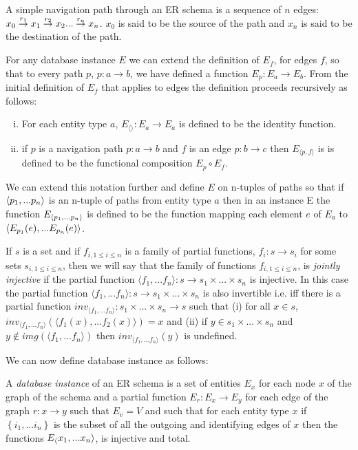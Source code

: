 \documentclass[10pt,a4paper]{article}
\newcommand{\set}[1]{\left\{#1\right\}}
\newcommand{\veee}{v}
\newcommand{\Veee}{V}
\newcommand{\term}[1]{\textit{{#1}}}
\begin{document}
\noindent A simple navigation path through an ER schema  is a
sequence of  $n$ edges:
$\overset{r_1}{x_0 \rightarrow   x_1} \overset{r_2}{\rightarrow} x_2 ... \overset{r_n}{\rightarrow} x_n$.  $x_0$ is said to be the source of the path and $x_n$ is said to be the destination of the path. 

\noindent For any database instance $E$ we can  extend  the definition of
$E_f$, for edges $f$,  so that to every path $p$, $p: a \rightarrow b$,  we have defined a function $E_p: E_a \rightarrow E_b$. From the initial definition of $E_f$ that applies to 
edges the definition proceeds recursively as follows: 
\begin{enumerate} [(i)]
\item{  For each entity type $a$, $E_{\langle \rangle}: E_a \rightarrow E_a$ is defined to be the identity function.
}
\item{   if $p$ is a navigation path $p: a \rightarrow b$ and $f$ is an edge $p: b \rightarrow c$ then $E_{\langle p,f \rangle}$ is 
is defined to be the functional composition $E_p \circ E_f$.
}
\end{enumerate}

We can extend this notation further and define $E$ on n-tuples of paths so that if 
$\langle p_1,...p_n\rangle$ is an n-tuple of paths from entity type $a$ then in an instance E
the function  $E_{\langle p_1,...p_n\rangle}$ is defined to be the function mapping each element $e$ 
of $E_a$ to 
$\langle E_{p_1}(e),...E_{p_n}(e)\rangle$.

\begin{definition}
If $s$ is a set and if $f_{i, 1\leq i \leq n}$ is a family of partial functions, $f_i: s \rightarrow s_i$   for some sets $s_{i, 1 \leq i \leq n}$,  then
we will say that the family of functions $f_{i, 1\leq i \leq n}$, is \term{jointly injective} if the partial function $\langle f_1,...f_n\rangle: s \rightarrow
s_1 \times ... \times s_n $ is injective. In this case the partial function $\langle f_1,...f_n\rangle: s \rightarrow
s_1 \times ... \times s_n $ is also invertible i.e. iff there is a partial function $inv_{\langle f_1,...f_n\rangle} : s_1 \times ... \times s_n \rightarrow s$ such that
(i) for all $x \in s$, $inv_{\langle f_1,...f_n\rangle}(\langle f_1(x),...f_2(x) \rangle ) = x$ and (ii) if $y \in s_1 \times ... \times s_n $ and
$y \notin img(\langle f_1,...f_n\rangle)$ then $inv_{\langle f_1,...f_n\rangle}(y)$ is undefined. \\
\end{definition}

\noindent We can now define database instance as follows:
\begin{definition}
\noindent A \term{database instance}  of an ER schema is
a set of entities $E_x$ for each node $x$ of the graph of the schema and 
a partial function $E_r : E_x \rightarrow E_y$ for each edge of the graph $r:x \rightarrow y$ 
such that $E_\veee=\Veee$
and such that 
for each entity type $x$ if $\set{i_1,...i_n}$ is the subset of all the outgoing and identifying edges
of $x$ then
the functions $E_\langle x_1,...x_n\rangle$, is injective
and total.
\end{definition}
\end{document}
